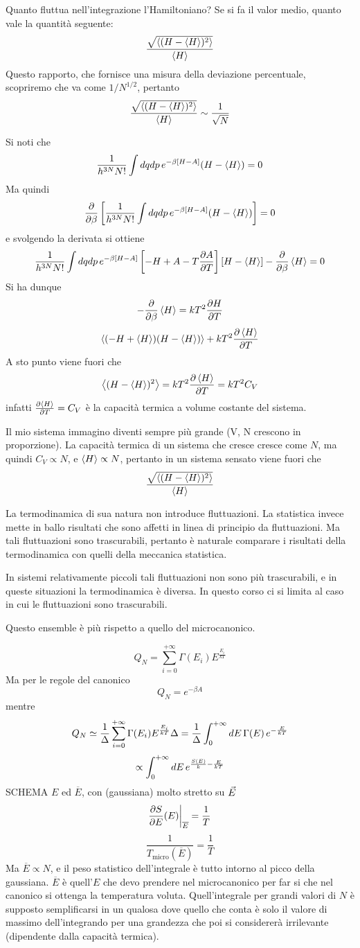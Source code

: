 \documentclass[../MeccanicaStatistica.tex]{subfiles}
\begin{document}
Quanto fluttua nell'integrazione l'Hamiltoniano? Se si fa il valor medio, quanto vale la quantità seguente:
\[
\frac{\sqrt{\left\langle{(H - \left\langle{H}\right\rangle)^2}\right\rangle}}{\left\langle{H}\right\rangle}
\]
Questo rapporto, che fornisce una misura della deviazione percentuale, scopriremo che va come $1/N^{1/2}$, pertanto
\[
\frac{\sqrt{\left\langle{(H - \left\langle{H}\right\rangle)^2}\right\rangle}}{\left\langle{H}\right\rangle} \sim \frac{1}{\sqrt{N}}
\]


Si noti che
\[
\frac{1}{h^{3N} N!} \int d q d p \, e^{- \beta [H - A]}(H - \left\langle{H}\right\rangle) = 0
\]
Ma quindi
\[
\frac{\partial }{\partial \beta} \left[\frac{1}{h^{3N} N!} \int d q d p \, e^{- \beta [H - A]}(H - \left\langle{H}\right\rangle) \right] = 0
\]
e svolgendo la derivata si ottiene
\[
\frac{1}{h^{3N} N!} \int d q d p \, e^{- \beta [H - A]} \left[-H + A - T \frac{\partial A}{\partial T} \right][H - \left\langle{H}\right\rangle] - \frac{\partial }{\partial \beta} \left\langle{H}\right\rangle = 0
\]
Si ha dunque
\[
- \frac{\partial }{\partial \beta} \left\langle{H}\right\rangle = k T^2 \frac{\partial H}{\partial T}
\]
\[
\left\langle{(-H + \left\langle{H}\right\rangle)(H - \left\langle{H}\right\rangle)}\right\rangle + k T^2 \frac{\partial \left\langle{H}\right\rangle}{\partial T}
\]
A sto punto viene fuori che
\[
\left\langle{(H - \left\langle{H}\right\rangle)^2}\right\rangle = k T^2 \frac{\partial \left\langle{H}\right\rangle}{\partial T} = k T^2 C_V
\]
infatti $\frac{\partial \left\langle{H}\right\rangle}{\partial T} = C_V$ è la capacità termica a volume costante del sistema.

Il mio sistema immagino diventi sempre più grande (V, N crescono in proporzione). La capacità termica di un sistema che cresce cresce come $N$, ma quindi $C_V \propto N$, e $\left\langle{H}\right\rangle \propto N$, pertanto in un sistema sensato viene fuori che
\[
\frac{\sqrt{\left\langle{(H - \left\langle{H}\right\rangle)^2}\right\rangle}}{\left\langle{H}\right\rangle}
\]


La termodinamica di sua natura non introduce fluttuazioni. La statistica invece mette in ballo risultati che sono affetti in linea di principio da fluttuazioni. Ma tali fluttuazioni sono trascurabili, pertanto è naturale comparare i risultati della termodinamica con quelli della meccanica statistica. 

In sistemi relativamente piccoli tali fluttuazioni non sono più trascurabili, e in queste situazioni la termodinamica è diversa. In questo corso ci si limita al caso in cui le fluttuazioni sono trascurabili.

Questo ensemble è più  rispetto a quello del microcanonico.

\[
Q_N = \sum_{i = 0}^{+\infty} \Gamma(E_i) E^{\frac{E_i}{k T}}
\]
Ma per le regole del canonico
\[
Q_N = e^{- \beta A}
\]
mentre 
\[
Q_N \simeq \frac{1}{\Delta} \sum_{i = 0}^{+\infty} \Gamma(E_i) E^{\frac{E_i}{k T}} \Delta = \frac{1}{\Delta} \int_0^{+\infty} d E \, \Gamma(E) \, e^{-\frac{E}{k T}}
\]
\[
\propto \int_0^{+ \infty} d E \, e^{\frac{S(E)}{k} - \frac{E}{k T}}
\]
SCHEMA $E$ ed $\overline E$, con  (gaussiana) molto stretto su $\vec E$
\[
\frac{\partial S}{\partial E}(E) \bigg|_{\overline E} = \frac{1}{T}
\]
\[
\frac{1}{T_{\text{micro}}(\overline E)} = \frac{1}{T}
\]
Ma $\overline E \propto N$, e il peso statistico dell'integrale è tutto intorno al picco della gaussiana.
$\overline E$ è quell'$E$ che devo prendere nel microcanonico per far si che nel canonico si ottenga la temperatura voluta. Quell'integrale per grandi valori di $N$ è supposto semplificarsi in un qualosa dove quello che conta è solo il valore di massimo dell'integrando per una grandezza che poi si considererà irrilevante (dipendente dalla capacità termica).
\end{document}
